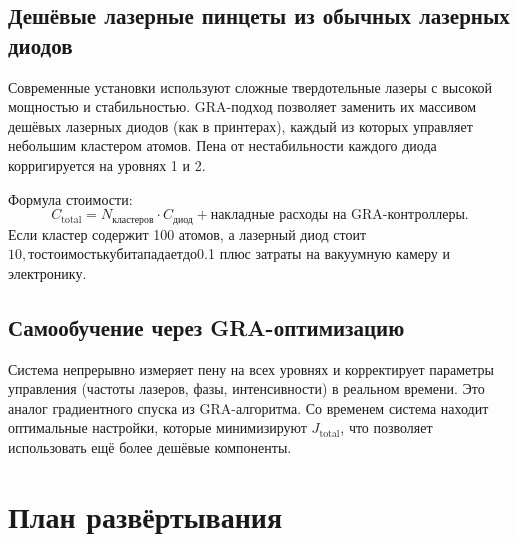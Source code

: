 \documentclass[12pt,a4paper]{article}
\begin{document}
\subsection{Дешёвые лазерные пинцеты из обычных лазерных диодов}

Современные установки используют сложные твердотельные лазеры с высокой мощностью и стабильностью. GRA-подход позволяет заменить их массивом дешёвых лазерных диодов (как в принтерах), каждый из которых управляет небольшим кластером атомов. Пена от нестабильности каждого диода корригируется на уровнях 1 и 2.

Формула стоимости:
\[
C_{\text{total}} = N_{\text{кластеров}} \cdot C_{\text{диод}} + \text{накладные расходы на GRA-контроллеры}.
\]
Если кластер содержит 100 атомов, а лазерный диод стоит $10, то стоимость кубита падает до $0.1 плюс затраты на вакуумную камеру и электронику.

\subsection{Самообучение через GRA-оптимизацию}

Система непрерывно измеряет пену на всех уровнях и корректирует параметры управления (частоты лазеров, фазы, интенсивности) в реальном времени. Это аналог градиентного спуска из GRA-алгоритма. Со временем система находит оптимальные настройки, которые минимизируют \(J_{\text{total}}\), что позволяет использовать ещё более дешёвые компоненты.

\section{План развёртывания}

\end{document}
